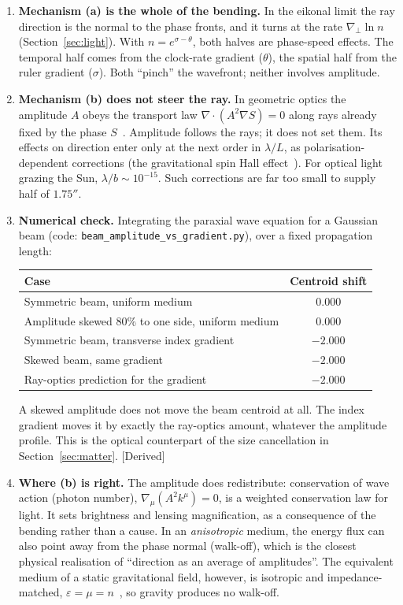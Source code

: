 \documentclass[11pt]{article}
\newcommand{\thP}{\theta}
\newcommand{\sgP}{\sigma}
\newcommand{\st}[1]{\textsf{\small[#1]}}
\theoremstyle{plain}
\theoremstyle{remark}
\begin{document}
\begin{enumerate}[1.]
\item \textbf{Mechanism (a) is the whole of the bending.} In the eikonal limit the ray direction is the normal to the phase fronts, and it turns at the rate $\nabla_\perp\ln n$ (Section~\ref{sec:light}). With $n=e^{\sgP-\thP}$, both halves are phase-speed effects. The temporal half comes from the clock-rate gradient ($\thP$), the spatial half from the ruler gradient ($\sgP$). Both ``pinch'' the wavefront; neither involves amplitude.
\item \textbf{Mechanism (b) does not steer the ray.} In geometric optics the amplitude $A$ obeys the transport law $\nabla\cdot(A^2\nabla S)=0$ along rays already fixed by the phase $S$~\cite{Ehlers1967,MTW}. Amplitude follows the rays; it does not set them. Its effects on direction enter only at the next order in $\lambda/L$, as polarisation-dependent corrections (the gravitational spin Hall effect~\cite{Oancea2020}). For optical light grazing the Sun, $\lambda/b\sim10^{-15}$. Such corrections are far too small to supply half of $1.75''$.
\item \textbf{Numerical check.} Integrating the paraxial wave equation for a Gaussian beam (code: \texttt{beam\_amplitude\_vs\_gradient.py}), over a fixed propagation length:
\begin{center}
\begin{tabular}{@{}lc@{}}
\toprule
Case & Centroid shift \\
\midrule
Symmetric beam, uniform medium & $0.000$ \\
Amplitude skewed 80\% to one side, uniform medium & $0.000$ \\
Symmetric beam, transverse index gradient & $-2.000$ \\
Skewed beam, same gradient & $-2.000$ \\
Ray-optics prediction for the gradient & $-2.000$ \\
\bottomrule
\end{tabular}
\end{center}
A skewed amplitude does not move the beam centroid at all. The index gradient moves it by exactly the ray-optics amount, whatever the amplitude profile. This is the optical counterpart of the size cancellation in Section~\ref{sec:matter}. \st{Derived}
\item \textbf{Where (b) is right.} The amplitude does redistribute: conservation of wave action (photon number), $\nabla_\mu(A^2k^\mu)=0$, is a weighted conservation law for light. It sets brightness and lensing magnification, as a consequence of the bending rather than a cause. In an \emph{anisotropic} medium, the energy flux can also point away from the phase normal (walk-off), which is the closest physical realisation of ``direction as an average of amplitudes''. The equivalent medium of a static gravitational field, however, is isotropic and impedance-matched, $\varepsilon=\mu=n$~\cite{Plebanski1960,deFelice1971}, so gravity produces no walk-off.
\end{enumerate}
\end{document}
